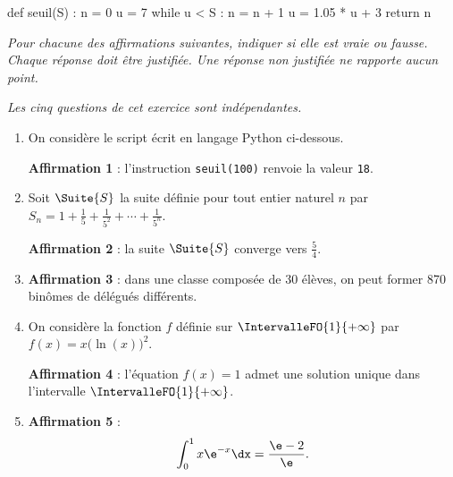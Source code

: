 \begin{scontents}[overwrite,write-out=frs2024j2exo3.py]
def seuil(S) :
	n = 0
	u = 7
	while u < S :
		n = n + 1
		u = 1.05 * u + 3
	return n
\end{scontents}

\textit{Pour chacune des affirmations suivantes, indiquer si elle est vraie ou fausse. Chaque réponse doit être justifiée. Une réponse non justifiée ne rapporte aucun point.}

\textit{Les cinq questions de cet exercice sont indépendantes.}

\bigskip

\begin{enumerate}
	\item On considère le script écrit en langage \textsf{Python} ci-dessous.
	
	
	\medskip

	\textbf{Affirmation 1} : l'instruction \texttt{seuil(100)} renvoie la valeur \texttt{18}.
	
	\bigskip
	\item Soit $\Suite{S}$ la suite définie pour tout entier naturel $n$ par $S_n = 1 + \frac{1}{5} + \frac{1}{5^2} + \cdots + \frac{1}{5^n}$.
	
	\smallskip
	
	\textbf{Affirmation 2} : la suite $\Suite{S}$ converge vers $\frac{5}{4}$.
	
	\bigskip
	\item \textbf{Affirmation 3} : dans une classe composée de 30 élèves, on peut former 870 binômes de délégués différents.
	
	\bigskip
	\item On considère la fonction $f$ définie sur $\IntervalleFO{1}{+\infty}$ par $f(x) = x \big(\ln(x)\big)^2$.
	
	\smallskip
	
	\textbf{Affirmation 4} : l'équation $f(x) = 1$ admet une solution unique dans l'intervalle $\IntervalleFO{1}{+\infty}$.
	
	\bigskip
	\item \textbf{Affirmation 5} : \[ \int_{0}^{1} x \e^{-x} \dx = \frac{\e - 2}{\e}.\]
\end{enumerate}